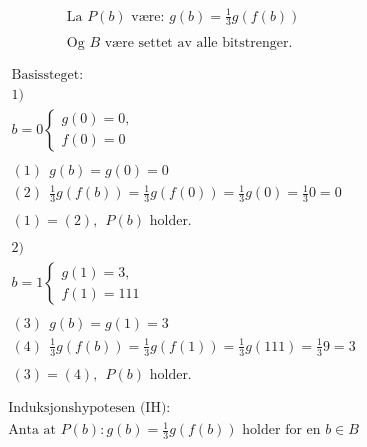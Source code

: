 \documentclass[norsk,8pt,a4paper]{report}
\newcommand{\oppgaveDel}[1]{\item[#1)]}
\begin{document}
\oppgaveDel{c}
\begin{align*}
&\text{La $P(b)$ være: } g(b) = \frac{1}{3} g(f(b))\\\\
&\text{Og $B$ være settet av alle bitstrenger.}\\\\
\end{align*}
\begin{align*}
&\text{Basissteget:}\\
&1)\\
&b = 0
\begin{cases}
g(0) = 0,\\
f(0) = 0
\end{cases}\\\\
&(1) \ \ g(b) = g(0) = 0\\
&(2) \ \ \frac{1}{3}g(f(b)) = \frac{1}{3}g(f(0)) = \frac{1}{3}g(0) = \frac{1}{3}0 = 0\\\\
&(1) = (2), \ \ \text{$P(b)$ holder.}\\\\
&2)\\
&b = 1
\begin{cases}
g(1) = 3,\\
f(1) = 111
\end{cases}\\\\
&(3) \ \ g(b) = g(1) = 3\\
&(4) \ \ \frac{1}{3}g(f(b)) = \frac{1}{3}g(f(1)) = \frac{1}{3}g(111) = \frac{1}{3}9 = 3\\\\
&(3) = (4), \ \ \text{$P(b)$ holder.}\\\\
\end{align*}
\begin{align*}
&\text{Induksjonshypotesen (IH):}\\
&\text{Anta at $P(b): g(b) = \frac{1}{3} g(f(b))$ holder for en $b \in B$}\\\\
\end{align*}
\end{document}
